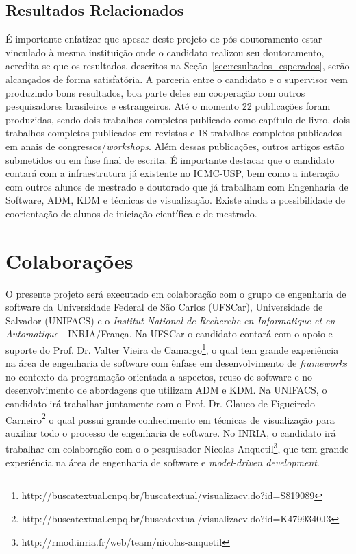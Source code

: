 \documentclass[12pt]{article}
\begin{document}
\subsection{Resultados Relacionados}

É importante enfatizar que apesar deste projeto de pós-doutoramento estar vinculado à mesma instituição onde o candidato realizou seu doutoramento, acredita-se que os resultados, descritos na Seção~\ref{sec:resultados_esperados}, serão alcançados de forma satisfatória. A parceria entre o candidato e o supervisor vem produzindo bons resultados, boa parte deles em cooperação com outros pesquisadores brasileiros e estrangeiros. Até o momento 22 publicações foram produzidas, sendo dois trabalhos completos publicado como capítulo de livro, dois trabalhos completos publicados em revistas e 18 trabalhos completos publicados em anais de congressos/\textit{workshops}. Além dessas publicações, outros artigos estão submetidos ou em fase final de escrita. É importante destacar que o candidato contará com a infraestrutura já existente no ICMC-USP, bem como a interação com outros alunos de mestrado e doutorado que já trabalham com Engenharia de Software, ADM, KDM e técnicas de visualização. Existe ainda a possibilidade de coorientação de alunos de iniciação científica e de mestrado.

\section{Colaborações}\label{sec:colaboracoes}

O presente projeto será executado em colaboração com o grupo de engenharia de software da Universidade Federal de São Carlos (UFSCar), Universidade de Salvador (UNIFACS) e o \textit{Institut National de Recherche en Informatique et en Automatique} - INRIA/França. Na UFSCar o candidato contará com o apoio e suporte do Prof. Dr. Valter Vieira de Camargo\footnote{http://buscatextual.cnpq.br/buscatextual/visualizacv.do?id=S819089}, o qual tem grande experiência na área de engenharia de software com ênfase em desenvolvimento de \textit{frameworks} no contexto da programação orientada a aspectos, reuso de software e no desenvolvimento de abordagens que utilizam ADM e KDM. Na UNIFACS, o candidato irá trabalhar juntamente com o Prof. Dr. Glauco de Figueiredo Carneiro\footnote{http://buscatextual.cnpq.br/buscatextual/visualizacv.do?id=K4799340J3} o qual possui grande conhecimento em técnicas de visualização para auxiliar todo o processo de engenharia de software. No INRIA, o candidato irá trabalhar em colaboração com o o pesquisador Nicolas Anquetil\footnote{http://rmod.inria.fr/web/team/nicolas-anquetil}, que tem grande experiência na área de engenharia de software e \textit{model-driven development}.


\footnotesize


\end{document}
